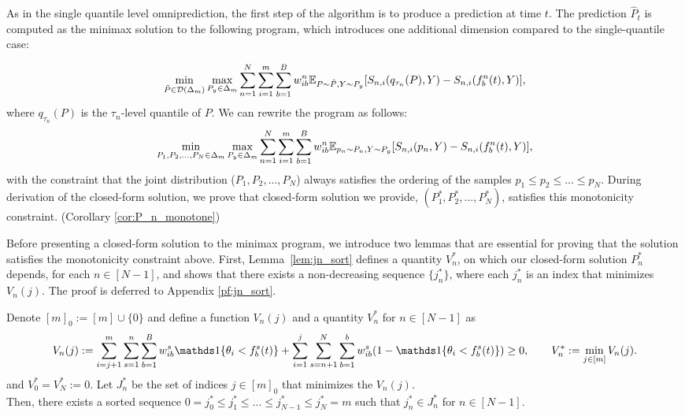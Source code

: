 As in the single quantile level omniprediction, the first step of the algorithm is to produce a prediction at time $t$. The prediction $\hat{P}_t$ is computed as the minimax solution to the following program, which introduces one additional dimension compared to the single-quantile case:

\[
\min_{\tilde{P} \in \mathcal{D}(\Delta_m)} \max_{P_y \in \Delta_m} \sum_{n=1}^N \sum_{i=1}^{m} \sum_{b=1}^B w_{ib}^n \mathbb{E}_{P\sim \tilde{P}, Y \sim P_y}[S_{n,i}(q_{\tau_n}(P),Y) - S_{n,i}(f_b^n(t),Y)],
\]
where $q_{\tau_n}(P)$ is the $\tau_n$-level quantile of $P$. We can rewrite the program as follows:
\begin{align}\label{eq:minimax_Pt_multi_q}
\min_{P_1, P_2, ..., P_N \in \Delta_m} \max_{P_y \in \Delta_m} \sum_{n=1}^N \sum_{i=1}^{m} \sum_{b=1}^B w_{ib}^n \mathbb{E}_{p_n \sim P_n
, Y \sim P_y}[S_{n,i}(p_n,Y) - S_{n,i}(f_b^n(t),Y)],
\end{align}
with the constraint that the joint distribution ($P_1, P_2, ..., P_N$) always satisfies the ordering of the samples $p_1 \leq p_2 \leq ... \leq p_N$. During derivation of the closed-form solution, we prove that closed-form solution we provide, $(P_1^*, P_2^*, ..., P_N^*)$, satisfies this monotonicity constraint. (Corollary \ref{cor:P_n_monotone})
\smallskip


Before presenting a closed-form solution to the minimax program, we introduce two lemmas that are essential for proving that the solution satisfies the monotonicity constraint above. First, Lemma~\ref{lem:jn_sort} defines a quantity $V_n^*$, on which our closed-form solution $P_n^*$ depends, for each $n \in [N-1]$, and shows that there exists a non-decreasing sequence $\{j_n^*\}$, where each $j_n^*$ is an index that minimizes $V_n(j)$. The proof is deferred to Appendix \ref{pf:jn_sort}.

\begin{lemma}\label{lem:jn_sort}
Denote $[m]_0 := [m] \cup \{0\}$ and define a function $V_n(j)$ and a quantity $V_n^*$ for $n \in [N-1]$ as
\begin{align} \label{eq:Vn_def}
V_n(j) := \sum_{i=j+1}^{m} \sum_{s=1}^{n} \sum_{b=1}^B w_{ib}^s \indi{\theta_i < f_b^s(t)} + \sum_{i=1}^{j} \sum_{s=n+1}^{N}  \sum_{b=1}^b w_{ib}^s (1 - \indi{\theta_i < f_b^s(t)}) \geq 0, %
\qquad V_n^* := \min_{j \in [m]} V_n(j).
\end{align}
and $V_0^* = V_N^* := 0$.
Let $J_n^*$ be the set of indices $j \in [m]_0$ that minimizes the $V_n(j)$. 
\smallskip \\
Then, there exists a sorted sequence $0=j_0^* \leq j_1^* \leq ... \leq j_{N-1}^* \leq j_N^* = m$ such that $j_n^* \in J_n^*$ for $n \in [N-1]$.
\end{lemma}



